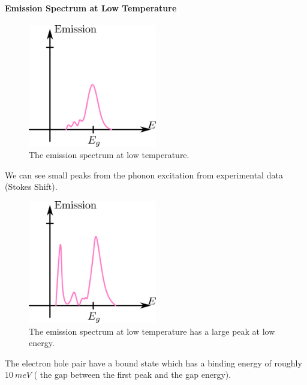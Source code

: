 \documentclass[../main.tex]{subfiles}
\begin{document}
\paragraph*{Emission Spectrum at Low Temperature}
\begin{figure} [ht]
    \centering
    \includegraphics[width=0.5\textwidth]{emission.png}
    \caption{The emission spectrum at low temperature.}
    \label{fig:emission}
\end{figure}
We can see small peaks from the phonon excitation from experimental data (Stokes Shift). 
\begin{figure} [ht]
    \centering
    \includegraphics[width=0.5\textwidth]{emissionrevised.png}
    \caption{The emission spectrum at low temperature has a large peak at low energy.}
    \label{fig:emissionrevised}
\end{figure}
The electron hole pair have a bound state which has a binding energy of roughly $\qty{10}{meV}$ (
the gap between the first peak and the gap energy). 
\end{document}
